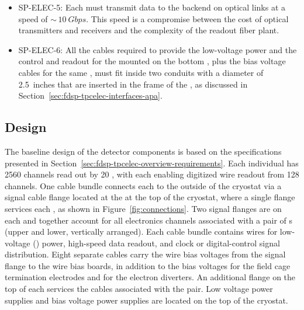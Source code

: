 \begin{itemize}
\item SP-ELEC-5: Each  must transmit data to the 
backend on optical links at a speed of $\sim\,\SI{10}{Gbps}$. This speed 
is a compromise between the cost of optical transmitters and
receivers and the complexity of the readout fiber plant.

\item SP-ELEC-6: All the cables required to provide the low-voltage power
and the control and readout for the  mounted on
the bottom , plus the bias voltage cables for
the same , must fit inside two conduits with a
diameter of \SI{2.5}{inches} that are inserted in the frame of
the , as discussed in Section~\ref{sec:fdsp-tpcelec-interfaces-apa}. 
\end{itemize}

\subsection{Design}
\label{sec:fdsp-tpcelec-overview-design}

The baseline design of the  detector components is
based on the specifications %
presented in Section~\ref{sec:fdsp-tpcelec-overview-requirements}. 
Each individual  has \num{2560} channels read out by \num{20} 
, with each  enabling digitized wire readout 
from \num{128} channels. One cable bundle connects each  to
the outside of the cryostat via a  signal cable flange located 
at the  \fdth at the top of the cryostat, where a single flange 
services each , as shown in Figure~\ref{fig:connections}. 
Two  signal flanges are on each \fdth and together account for 
all electronics channels associated with a pair of s (upper 
and lower, vertically arranged). Each cable bundle contains wires for 
low-voltage () power, high-speed data readout, and clock or 
digital-control signal distribution. Eight separate cables carry the 
 wire bias voltages from the signal flange to the  
wire bias boards, in addition to the bias voltages for the field cage 
termination electrodes and for the electron diverters. An additional 
flange on the top of each \fdth services the  cables associated 
with the  pair. Low voltage power supplies and bias voltage
power supplies are located on the top of the cryostat. 

